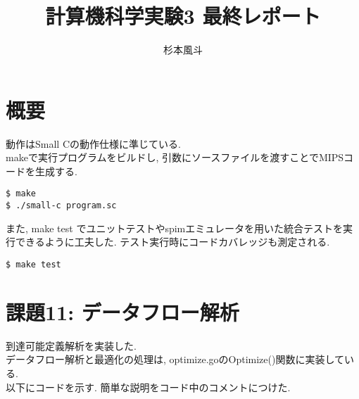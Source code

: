 \documentclass[a4j]{jarticle}
\begin{document}
\title{計算機科学実験3 最終レポート}
\author{杉本風斗}

\maketitle

\section{概要}
動作はSmall Cの動作仕様に準じている. \\
makeで実行プログラムをビルドし, 引数にソースファイルを渡すことでMIPSコードを生成する.

\begin{verbatim}
$ make
$ ./small-c program.sc
\end{verbatim}

また, make test でユニットテストやspimエミュレータを用いた統合テストを実行できるように工夫した. テスト実行時にコードカバレッジも測定される.

\begin{verbatim}
$ make test
\end{verbatim}

\section{課題11: データフロー解析}
到達可能定義解析を実装した. \\
データフロー解析と最適化の処理は, optimize.goのOptimize()関数に実装している. \\

以下にコードを示す. 簡単な説明をコード中のコメントにつけた.  \\
\end{document}
